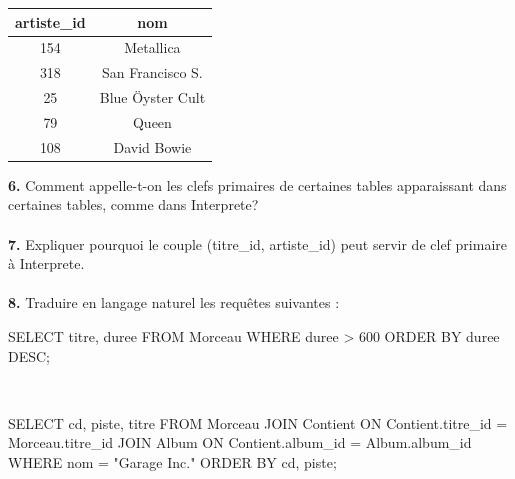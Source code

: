 \documentclass[a4paper,10pt,french]{book}
\begin{document}
\begin{center}
\begin{tabular}{|c|c|}
            \hline
        \end{tabular}	\hspace*{2em}
        \begin{tabular}{|c|c|}
            \hline
            \rowcolor{UGLiOrange} \color{white}\textbf{artiste\_id} &\color{white}\textbf{nom}\\
            \hline
            \color{white} 154   & Metallica	\\
            \hline
            318& \color{white}San Francisco S. \\
            \hline
            25 & \color{white}Blue Öyster Cult\\
            \hline
            79 &\color{white} Queen \\
            \hline
            108	&\color{white} David Bowie\\
            \hline
        \end{tabular}
    \end{center}
    \textbf{6.} Comment appelle-t-on les clefs primaires de certaines tables apparaissant dans certaines tables, comme dans Interprete?\\
    
\\
    
    \textbf{7.} Expliquer pourquoi le couple (titre\_id, artiste\_id) peut servir de clef primaire à Interprete.\\
    
\\

    \textbf{8.} Traduire en langage naturel les requêtes suivantes :	
    
    \begin{sql}
        SELECT titre, duree FROM Morceau 
        WHERE duree > 600 ORDER BY duree DESC;
    \end{sql}
    
\\
    
    \begin{sql}
        SELECT cd, piste, titre FROM Morceau
        JOIN Contient ON Contient.titre_id = Morceau.titre_id
        JOIN Album ON Contient.album_id = Album.album_id WHERE nom = "Garage Inc."
        ORDER BY cd, piste;
    \end{sql}
    
\\
    
\end{document}
